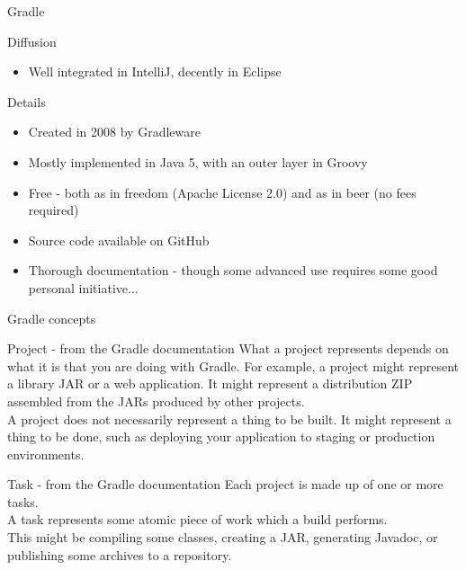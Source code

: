 \documentclass[presentation]{beamer}
\begin{document}
\begin{frame}{Gradle}
\begin{block}{Diffusion}
\begin{itemize}
			\item Well integrated in IntelliJ, decently in Eclipse
		\end{itemize}
	\end{block}
	\begin{block}{Details}
		\begin{itemize}
			\item Created in 2008 by Gradleware
			\item Mostly implemented in Java 5, with an outer layer in Groovy
			\item Free - both as in freedom (Apache License 2.0) and as in beer (no fees required)
			\item Source code available on GitHub
			\item Thorough documentation - though some advanced use requires some good personal initiative...
		\end{itemize}
	\end{block}
\end{frame}

\begin{frame}[fragile]{Gradle concepts}
	\begin{block}{Project - from the Gradle documentation}
			What a project represents depends on what it is that you are doing with Gradle. For example, a project might represent a library JAR or a web application. It might represent a distribution ZIP assembled from the JARs produced by other projects. \\
			A project does not necessarily represent a thing to be built.
			It might represent a thing to be done, such as deploying your application to staging or production environments.
	\end{block}
	\begin{block}{Task - from the Gradle documentation}
			Each project is made up of one or more tasks. \\
			A task represents some atomic piece of work which a build performs.\\
			This might be compiling some classes, creating a JAR, generating Javadoc, or publishing some archives to a repository.
	\end{block}
\end{frame}
\end{document}
